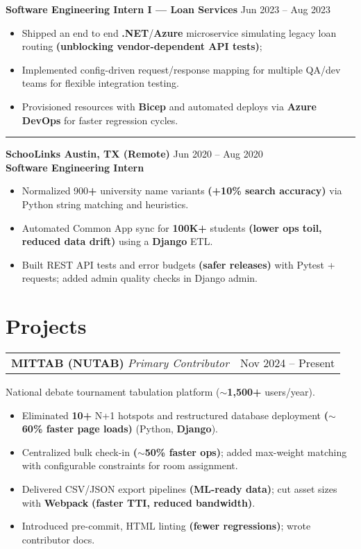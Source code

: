 \documentclass[11pt]{article}
\makeatletter
\newcommand{\EmployerSize}{11}
\newcommand{\EmployerLead}{13}
\newcommand{\EmployerWeight}{\bfseries}
\newcommand{\EmployerPreSkip}{2pt}
\newcommand{\EmployerPostSkip}{-2pt}
\newcommand{\RoleTitleSize}{11}
\newcommand{\RoleTitleLead}{13}
\newcommand{\RoleTitleWeight}{\bfseries}
\newcommand{\RoleDateSize}{10}
\newcommand{\RoleDateLead}{12}
\newcommand{\RolePreSkip}{2pt}
\newcommand{\RolePostSkip}{-8pt}
\newcommand{\BulletSize}{10}
\newcommand{\BulletLead}{12}
\newcommand{\BlurbSize}{10}
\newcommand{\BlurbLead}{12}
\newcommand{\BlurbPre}{0pt}
\newcommand{\BlurbPost}{-8pt}
\newcommand{\SepLength}{0.1\textwidth}
\newcommand{\SepThickness}{0.5pt}
\newcommand{\SepRaise}{1ex}
\newenvironment{twocol}[2]{%
  \noindent\begin{tabular*}{\textwidth}{@{\extracolsep{\fill}} l r}
  #1 & #2\\
  \end{tabular*}\ignorespaces
}{\par}
\newcommand{\EmployerHeader}[2]{%
  \vspace*{\EmployerPreSkip}%
  \noindent
  {\fontsize{\EmployerSize}{\EmployerLead}\selectfont \EmployerWeight #1}%
  \hfill
  {\fontsize{\EmployerSize}{\EmployerLead}\selectfont #2}%
  \\[\EmployerPostSkip]%
}
\newcommand{\RoleHeader}[2]{%
  \vspace*{\RolePreSkip}%
  \noindent
  {\fontsize{\RoleTitleSize}{\RoleTitleLead}\selectfont \RoleTitleWeight #1}%
  \hfill
  {\fontsize{\RoleDateSize}{\RoleDateLead}\selectfont #2}%
  \\[\RolePostSkip]%
}
\newenvironment{ResumeItemize}{%
  \begin{itemize}\fontsize{\BulletSize}{\BulletLead}\selectfont
}{%
  \end{itemize}
}
\newcommand{\ProjectBlurb}[1]{%
  \vspace*{\BlurbPre}%
  {\fontsize{\BlurbSize}{\BlurbLead}\selectfont #1}%
  \\[\BlurbPost]%
}
\newcommand*\sepline{\noindent\rule[\SepRaise]{\SepLength}{\SepThickness}\par}
\makeatother
\begin{document}
\RoleHeader{Software Engineering Intern I — Loan Services}{Jun 2023 -- Aug 2023}
\begin{ResumeItemize}
  \item Shipped an end to end \textbf{.NET}/\textbf{Azure} microservice simulating legacy loan routing \textbf{(unblocking vendor-dependent API tests)};
  \item Implemented config-driven request/response mapping for multiple QA/dev teams for flexible integration testing.
  \item Provisioned resources with \textbf{Bicep} and automated deploys via \textbf{Azure DevOps} for faster regression cycles.
\end{ResumeItemize}

\sepline

\EmployerHeader{SchooLinks \quad Austin, TX (Remote)}{Jun 2020 -- Aug 2020}
\RoleHeader{Software Engineering Intern}{}
\begin{ResumeItemize}
  \item Normalized 900\textbf{+} university name variants \textbf{(+10\% search accuracy)} via Python string matching and heuristics.
  \item Automated Common App sync for \textbf{100K+} students \textbf{(lower ops toil, reduced data drift)} using a \textbf{Django} ETL.
  \item Built REST API tests and error budgets \textbf{(safer releases)} with Pytest + requests; added admin quality checks in Django admin.
\end{ResumeItemize}

\section{Projects}

\begin{twocol}{\textbf{MIT\textendash TAB (NU\textendash TAB)} \;\textit{Primary Contributor}}{Nov 2024 -- Present}\end{twocol}
\ProjectBlurb{National debate tournament tabulation platform (\(\sim\)\textbf{1{,}500+} users/year).}
\begin{ResumeItemize}
  \item Eliminated \textbf{10+} N+1 hotspots and restructured database deployment \textbf{(\(\sim\)60\% faster page loads)} (Python, \textbf{Django}).
  \item Centralized bulk check-in \textbf{(\(\sim\)50\% faster ops)}; added max-weight matching with configurable constraints for room assignment.
  \item Delivered CSV/JSON export pipelines \textbf{(ML-ready data)}; cut asset sizes with \textbf{Webpack} \textbf{(faster TTI, reduced bandwidth)}.
  \item Introduced pre-commit, HTML linting \textbf{(fewer regressions)}; wrote contributor docs.
\end{ResumeItemize}
\end{document}
